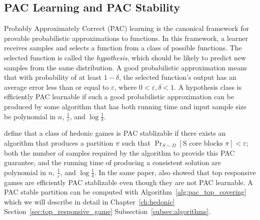 \subsection{PAC Learning and PAC Stability}
Probably Approximately Correct (PAC) learning is the canonical framework for provable probabilistic approximations to functions. In this framework, a learner receives samples and selects a function from a class of possible functions. The selected function is called the \textit{hypothesis}, which should be likely to predict new samples from the same distribution. A good probabilistic approximation means that with probability of at least $1 - \delta$, the selected function's output has an average error less than or equal to $\varepsilon$, where $0 < \varepsilon, \delta < 1$. A hypothesis class is efficiently PAC learnable if such a good probabilistic approximation can be produced by some algorithm that has both running time and input sample size be polynomial in $n$, $\frac{1}{\varepsilon}$, and $\log{\frac{1}{\delta}}$.

 define that a class of hedonic games is PAC stablizable if there exists an algorithm that produces a partition $\pi$ such that $\Pr_{S\sim D}[\text{S core blocks } \pi] < \varepsilon$; both the number of samples required by the algorithm to provide this PAC guarantee, and the running time of producing a consistent solution are polynomial in $n$, $\frac{1}{\varepsilon}$, and $\log{\frac{1}{\delta}}$. In the same paper,  also showed that top responsive games are efficiently PAC stablizable even though they are not PAC learnable.
A PAC stable partition can be computed with Algorithm~\ref{alg:pac_top_covering} which we will describe in detail in Chapter~\ref{ch:hedonic} Section~\ref{sec:top_responsive_game} Subsection~\ref{subsec:algorithms}.
